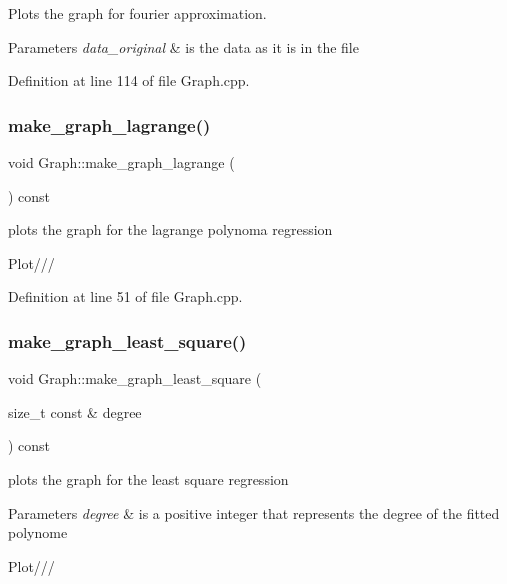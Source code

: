 Plots the graph for fourier approximation. 


\begin{DoxyParams}{Parameters}
{\em data\+\_\+original} & is the data as it is in the file \\
\hline
\end{DoxyParams}


Definition at line 114 of file Graph.\+cpp.

\mbox{\label{class_graph_a5fd01460d3981748a22269f9953d3486}} 
\subsubsection{\texorpdfstring{make\+\_\+graph\+\_\+lagrange()}{make\_graph\_lagrange()}}
{\footnotesize\ttfamily void Graph\+::make\+\_\+graph\+\_\+lagrange (\begin{DoxyParamCaption}{ }\end{DoxyParamCaption}) const}



plots the graph for the lagrange polynoma regression 

Plot/// 

Definition at line 51 of file Graph.\+cpp.

\mbox{\label{class_graph_af3560cb4e5eaa08c33e3de253a4e60a3}} 
\subsubsection{\texorpdfstring{make\+\_\+graph\+\_\+least\+\_\+square()}{make\_graph\_least\_square()}}
{\footnotesize\ttfamily void Graph\+::make\+\_\+graph\+\_\+least\+\_\+square (\begin{DoxyParamCaption}\item[{size\+\_\+t const \&}]{degree }\end{DoxyParamCaption}) const}



plots the graph for the least square regression 


\begin{DoxyParams}{Parameters}
{\em degree} & is a positive integer that represents the degree of the fitted polynome \\
\hline
\end{DoxyParams}
Plot/// 

